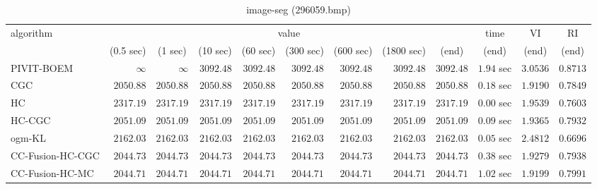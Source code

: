 \begin{table}[H]
\scriptsize
\centering
\caption{image-seg (296059.bmp)}
\label{tab:anytimetable-image-seg-296059.bmp}
\begin{tabular}{lrrrrrrrrrrr}
\toprule
           algorithm &                                   \multicolumn{8}{c}{value} & \multicolumn{1}{c}{time}    & \multicolumn{1}{c}{VI}  & \multicolumn{1}{c}{RI} \\  
\cmidrule(lr){2-9}\cmidrule(lr){10-10} \cmidrule(lr){11-11} \cmidrule(lr){12-12}   
                     & \multicolumn{1}{c}{(0.5 sec)} & \multicolumn{1}{c}{(1 sec)} & \multicolumn{1}{c}{(10 sec)} & \multicolumn{1}{c}{(60 sec)} & \multicolumn{1}{c}{(300 sec)} & \multicolumn{1}{c}{(600 sec)} & \multicolumn{1}{c}{(1800 sec)} & \multicolumn{1}{c}{(end)} & \multicolumn{1}{c}{(end)}    & \multicolumn{1}{c}{(end)}   & \multicolumn{1}{c}{(end)}  \\ \midrule 
          PIVIT-BOEM & $\infty$ & $\infty$ & $      3092.48$ & $      3092.48$ & $      3092.48$ & $      3092.48$ & $      3092.48$ & $      3092.48$ & $         1.94$ sec    & $       3.0536$  & $       0.8713$ \\ 
                 CGC & $      2050.88$ & $      2050.88$ & $      2050.88$ & $      2050.88$ & $      2050.88$ & $      2050.88$ & $      2050.88$ & $      2050.88$ & $         0.18$ sec    & $       1.9190$  & $       0.7849$ \\ 
                  HC & $      2317.19$ & $      2317.19$ & $      2317.19$ & $      2317.19$ & $      2317.19$ & $      2317.19$ & $      2317.19$ & $      2317.19$ & $         0.00$ sec    & $       1.9539$  & $       0.7603$ \\ 
              HC-CGC & $      2051.09$ & $      2051.09$ & $      2051.09$ & $      2051.09$ & $      2051.09$ & $      2051.09$ & $      2051.09$ & $      2051.09$ & $         0.09$ sec    & $       1.9365$  & $       0.7932$ \\ 
              ogm-KL & $      2162.03$ & $      2162.03$ & $      2162.03$ & $      2162.03$ & $      2162.03$ & $      2162.03$ & $      2162.03$ & $      2162.03$ & $         0.05$ sec    & $       2.4812$  & $       0.6696$ \\ 
    CC-Fusion-HC-CGC & $      2044.73$ & $      2044.73$ & $      2044.73$ & $      2044.73$ & $      2044.73$ & $      2044.73$ & $      2044.73$ & $      2044.73$ & $         0.38$ sec    & $       1.9279$  & $       0.7938$ \\ 
     CC-Fusion-HC-MC & $      2044.71$ & $      2044.71$ & $      2044.71$ & $      2044.71$ & $      2044.71$ & $      2044.71$ & $      2044.71$ & $      2044.71$ & $         1.02$ sec    & $       1.9199$  & $       0.7991$ \\ 

\end{tabular}
\end{table}

